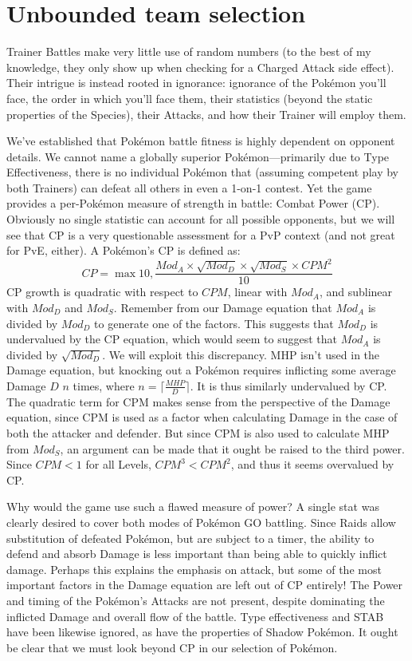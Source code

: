 \chapter{Unbounded team selection}
\label{chap:unbounded}
Trainer Battles make very little use of random numbers (to the best of my
 knowledge, they only show up when checking for a Charged Attack side
 effect).
Their intrigue is instead rooted in ignorance: ignorance of
 the Pokémon you'll face, the order in which you'll face them,
 their statistics (beyond the static properties of the Species),
 their Attacks, and how their Trainer will employ them.

We've established that Pokémon battle fitness is highly dependent
 on opponent details.
We cannot name a globally superior Pokémon---primarily due to Type Effectiveness,
 there is no individual Pokémon that (assuming competent play by both Trainers)
 can defeat all others in even a 1-on-1 contest.
Yet the game provides a per-Pokémon measure of strength in battle: Combat Power (CP).
Obviously no single statistic can account for all possible opponents, but
 we will see that CP is a very questionable assessment for a PvP
 context (and not great for PvE, either).
A Pokémon's CP is defined as:
\[ CP = \max{10, \frac{Mod_A \times \sqrt{Mod_D} \times \sqrt{Mod_S} \times CPM^2}{10}} \]
CP growth is quadratic with respect to $CPM$, linear with $Mod_A$, and
  sublinear with $Mod_D$ and $Mod_S$.
Remember from our Damage equation that $Mod_A$ is divided by $Mod_D$
 to generate one of the factors.
This suggests that $Mod_D$ is undervalued by the CP equation, which
 would seem to suggest that $Mod_A$ is divided by $\sqrt{Mod_D}$.
We will exploit this discrepancy.
MHP isn't used in the Damage equation, but knocking out a Pokémon
 requires inflicting some average Damage $D$ $n$ times,
 where $n = \lceil\frac{MHP}{D}\rceil$.
It is thus similarly undervalued by CP\@.
The quadratic term for CPM makes sense from the perspective of the Damage
 equation, since CPM is used as a factor when calculating Damage in the
 case of both the attacker and defender.
But since CPM is also used to calculate MHP from $Mod_S$, an argument
 can be made that it ought be raised to the third power.
Since $CPM < 1$ for all Levels, $CPM^3 < CPM^2$, and thus it seems
 overvalued by CP\@.

Why would the game use such a flawed measure of power?
A single stat was clearly desired to cover both modes of Pokémon GO battling.
Since Raids allow substitution of defeated Pokémon, but are subject to a timer,
  the ability to defend and absorb Damage is less important than being able to
  quickly inflict damage.
Perhaps this explains the emphasis on attack, but some of the most important
  factors in the Damage equation are left out of CP entirely!
The Power and timing of the Pokémon's Attacks are not present, despite
  dominating the inflicted Damage and overall flow of the battle.
Type effectiveness and STAB have been likewise ignored, as have the
  properties of Shadow Pokémon.
It ought be clear that we must look beyond CP in our selection of Pokémon.

